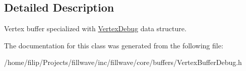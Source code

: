 \subsection{Detailed Description}
Vertex buffer specialized with \hyperlink{structfillwave_1_1core_1_1VertexDebug}{Vertex\+Debug} data structure. 

The documentation for this class was generated from the following file\+:\begin{DoxyCompactItemize}
\item 
/home/filip/\+Projects/fillwave/inc/fillwave/core/buffers/Vertex\+Buffer\+Debug.\+h\end{DoxyCompactItemize}
